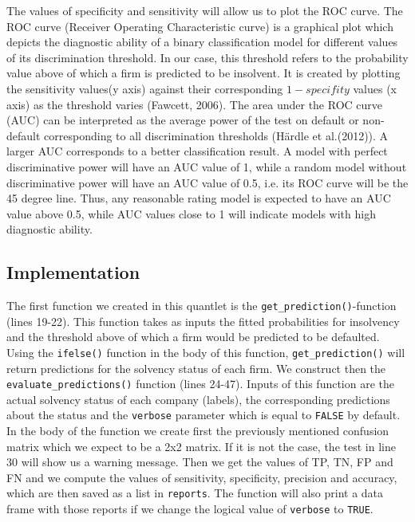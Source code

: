 \documentclass{article}
\begin{document}
The values of specificity and sensitivity will allow us to plot the ROC curve. The ROC curve (Receiver Operating Characteristic curve) is a graphical plot which depicts the diagnostic ability of a binary classification model for different values of its discrimination threshold. In our case, this threshold refers to the probability value above of which a firm is predicted to be insolvent. It is created by plotting the sensitivity values(y axis) against their corresponding $1-specifity$ values (x axis) as the threshold varies (Fawcett, 2006). The area under the ROC curve (AUC) can be interpreted as the average power of the test on default or non-default corresponding to all discrimination thresholds (H\"ardle et al.(2012)). A larger AUC corresponds to a better classification result. A model with perfect discriminative power will have an AUC value of 1, while a random model without discriminative power will have an AUC value of 0.5, i.e. its ROC curve will be the 45 degree line. Thus, any reasonable rating model is expected to have an AUC value above 0.5, while AUC values close to 1 will indicate models with high diagnostic ability.  

\subsection{Implementation}



The first function we created in this quantlet is the \texttt{get\_prediction()}-function (lines 19-22). This function takes as inputs the fitted probabilities for insolvency and the threshold above of which a firm would be predicted to be defaulted. Using the \texttt{ifelse()} function in the body of this function, \texttt{get\_prediction()} will return predictions for the solvency status of each firm. We construct then the \texttt{evaluate\_predictions()} function (lines 24-47). Inputs of this function are the actual solvency status of each company (labels), the corresponding predictions about the status and the \texttt{verbose} parameter which is equal to \texttt{FALSE} by default. In the body of the function we create first the previously mentioned confusion matrix which we expect to be a 2x2 matrix. If it is not the case, the test in line 30 will show us a warning message. Then we get the values of TP, TN, FP and FN and we compute the values of sensitivity, specificity, precision and accuracy, which are then saved as a list in \texttt{reports}. The function will also print a data frame with those reports if we change the logical value of \texttt{verbose} to \texttt{TRUE}.
\end{document}
